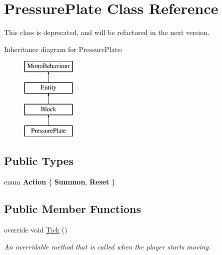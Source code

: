 \hypertarget{class_pressure_plate}{}\section{Pressure\+Plate Class Reference}
\label{class_pressure_plate}


This class is deprecated, and will be refactored in the next version.  


Inheritance diagram for Pressure\+Plate\+:\begin{figure}[H]
\begin{center}
\leavevmode
\includegraphics[height=4.000000cm]{class_pressure_plate}
\end{center}
\end{figure}
\subsection*{Public Types}
\begin{DoxyCompactItemize}
\item 
\mbox{\label{class_pressure_plate_a39c3f9c6069e590e7bad66bf7d4761be}} 
enum {\bfseries Action} \{ {\bfseries Summon}, 
{\bfseries Reset}
 \}
\end{DoxyCompactItemize}
\subsection*{Public Member Functions}
\begin{DoxyCompactItemize}
\item 
override void \mbox{\hyperlink{class_pressure_plate_a38ab73177e6bef277e62247d7f5fe2f8}{Tick}} ()
\begin{DoxyCompactList}\small\item\em An overridable method that is called when the player starts moving. \end{DoxyCompactList}\end{DoxyCompactItemize}
